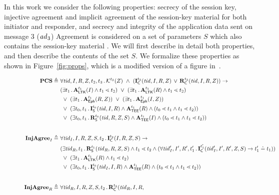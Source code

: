 In this work we consider the following properties: secrecy of the session key,
injective agreement and implicit agreement of the session-key material for both
initiator and responder, and secrecy and integrity of the application data sent
on message 3 ($\mathit{ad}_3$)
%
Agreement is considered on a set of parameters $S$ which also contains the
session-key material \mSessKey{}.
%
We will first describe in detail both properties, and then describe the
contents of the set $S$.
%
We formalize these properties as shown in Figure~\ref{fig:props}, which is
a modified version of a figure in~\cite{Norr21}.
\begin{figure*}[ht]
\begin{align*}
    \mPredPcs \triangleq\ & \forall \mTID, I, R, \mSessKey, t_2, t_3\mLogicDot
    \mK^{t_3}(\mSessKey)\  \land\ 
    (\mIComplete^{t_2}(\mTID, I, R, \mSessKey)\, \lor\, \mRComplete^{t_2}(\mTID, I, R, 
\mSessKey))
    \rightarrow\\
    &(\exists t_1\mLogicDot \mRevLTK^{t_1}(I) \land t_1 \lessdot t_2)
    \ \lor\ (\exists t_1\mLogicDot \mRevLTK^{t_1}(R) \land t_1 \lessdot t_2)\\
    &\ \lor\ (\exists t_1\mLogicDot \mRevEph^{t_1}(R, \mSessKey))
    \ \lor\ (\exists t_1\mLogicDot \mRevEph^{t_1}(I, \mSessKey))\\
    &\ \lor\ (\exists t_0, t_1\mLogicDot \mIStart^{t_0}(\mTID, I, R) \land \mTEE^{t_1}(R) \land (t_0 \lessdot t_1 \land t_1 \lessdot t_2))\\
    &\ \lor\ (\exists t_0, t_1\mLogicDot \mRStart^{t_0}(\mTID, R, \mSessKey, S) \land \mTEE^{t_1}(I) \land (t_0 \lessdot t_1 \land t_1 \lessdot t_2))\\[2em]
%
    \mPredInjI \triangleq\ &
    \forall \mTID_I, I, R, \mSessKey, S, t_2\mLogicDot \mIComplete^{t_2}(I, R, 
\mSessKey, S)
    \rightarrow\\
    &(\exists \mTID_R, t_1\mLogicDot \mRStart^{t_1}(\mTID_R, R, \mSessKey, S) \land t_1 \lessdot t_2
    \land (\forall \mTID_I', I', R', t_1' \mLogicDot \mIComplete^{t_1'}(\mTID_I', I' , R', \mSessKey, S)
        \rightarrow t_1' \doteq t_1))\\
    &\ \lor\ (\exists t_1\mLogicDot \mRevLTK^{t_1}(R) \land t_1 \lessdot t_2)\\
    &\ \lor\ (\exists t_0, t_1\mLogicDot \mIStart^{t_0}(\mTID_I, I, R) \land \mTEE^{t_1}(R) \land (t_0 \lessdot t_1 \land t_1 \lessdot t_2))\\[2em]
%
    \mPredInjR \triangleq\ &
    \forall \mTID_R, I, R, \mSessKey, S, t_2\mLogicDot \mRComplete^{t_2}(\mTID_R, I, R, 

\end{align*}
\end{figure*}
